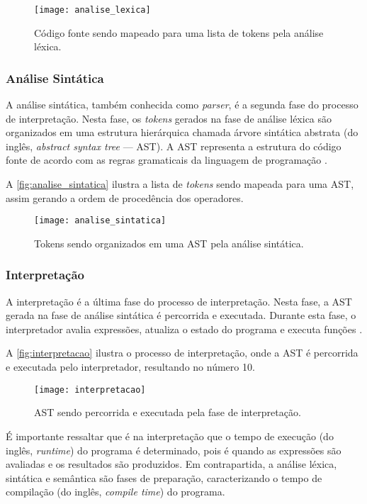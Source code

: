 \begin{figure}[H]
	\centering
	\texttt{[image: analise\_lexica]}
	\caption{Código fonte sendo mapeado para uma lista de tokens pela análise léxica.}
	\label{fig:analise_lexica}
\end{figure}

\subsubsection{Análise Sintática}

A análise sintática, também conhecida como \textit{parser}, é a segunda fase do processo de interpretação. Nesta fase, os \textit{tokens} gerados na fase de análise léxica são organizados em uma estrutura hierárquica chamada árvore sintática abstrata (do inglês, \textit{abstract syntax tree} — AST). A AST representa a estrutura do código fonte de acordo com as regras gramaticais da linguagem de programação \cite{craftinginterpreters}.

A \autoref{fig:analise_sintatica} ilustra a lista de \textit{tokens} sendo mapeada para uma AST, assim gerando a ordem de procedência dos operadores.

\begin{figure}[H]
	\centering
	\texttt{[image: analise\_sintatica]}
	\caption{Tokens sendo organizados em uma AST pela análise sintática.}
	\label{fig:analise_sintatica}
\end{figure}

\subsubsection{Interpretação}

A interpretação é a última fase do processo de interpretação. Nesta fase, a AST gerada na fase de análise sintática é percorrida e executada. Durante esta fase, o interpretador avalia expressões, atualiza o estado do programa e executa funções \cite{craftinginterpreters}.

A \autoref{fig:interpretacao} ilustra o processo de interpretação, onde a AST é percorrida e executada pelo interpretador, resultando no número 10.

\begin{figure}[H]
	\centering
	\texttt{[image: interpretacao]}
	\caption{AST sendo percorrida e executada pela fase de interpretação.}
	\label{fig:interpretacao}
\end{figure}

É importante ressaltar que é na interpretação que o tempo de execução (do inglês, \textit{runtime}) do programa é determinado, pois é quando as expressões são avaliadas e os resultados são produzidos. Em contrapartida, a análise léxica, sintática e semântica são fases de preparação, caracterizando o tempo de compilação (do inglês, \textit{compile time}) do programa.
